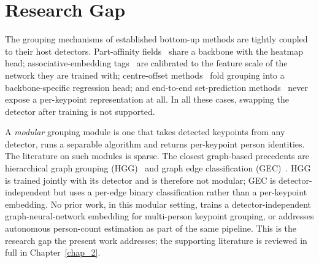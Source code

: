 \section{Research Gap}
\label{sec_intro_gap}

The grouping mechanisms of established bottom-up methods are tightly coupled to their host detectors.
Part-affinity fields~\cite{cao2017openpose, kreiss2019pifpaf} share a backbone with the heatmap head;
associative-embedding tags~\cite{newell2017associative, cheng2020higherhrnet}
are calibrated to the feature scale of the network they are trained with;
centre-offset methods~\cite{geng2021dekr, braso2021centergroup} fold grouping into a backbone-specific regression head;
and end-to-end set-prediction methods~\cite{shi2022petr, yang2023edpose}
never expose a per-keypoint representation at all.
In all these cases, swapping the detector after training is not supported.

A \emph{modular} grouping module is one that takes detected keypoints from any 
detector, runs a separable algorithm and returns per-keypoint person identities. 
The literature on such modules is sparse.
The closest graph-based precedents are hierarchical graph grouping (HGG)~\cite{jin2020hgg}
and graph edge classification (GEC)~\cite{maher2025gec}.
HGG is trained jointly with its detector and is therefore not modular;
GEC is detector-independent but uses a per-edge binary classification rather than a per-keypoint embedding.
No prior work, in this modular setting, trains a detector-independent 
graph-neural-network embedding for multi-person 
keypoint grouping, or addresses autonomous person-count estimation as part of the same pipeline.
This is the research gap the present work addresses; the supporting literature is reviewed in full in Chapter~\ref{chap_2}.